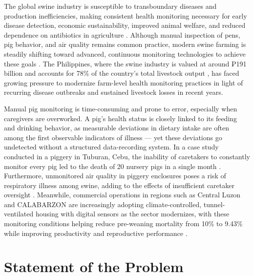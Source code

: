 The global swine industry is susceptible to transboundary diseases and production inefficiencies, making consistent health monitoring necessary for early disease detection, economic sustainability, improved animal welfare, and reduced dependence on antibiotics in agriculture \cite{beyondtech2025smart}. Although manual inspection of pens, pig behavior, and air quality remains common practice, modern swine farming is steadily shifting toward advanced, continuous monitoring technologies to achieve these goals \cite{beyondtech2025smart}. The Philippines, where the swine industry is valued at around ₱191 billion and accounts for 78\% of the country's total livestock output \cite{lo2025rebooting}\cite{livestockproduction2026}, has faced growing pressure to modernize farm-level health monitoring practices in light of recurring disease outbreaks and sustained livestock losses in recent years.

Manual pig monitoring is time-consuming and prone to error, especially when caregivers are overworked. A pig's health status is closely linked to its feeding and drinking behavior, as measurable deviations in dietary intake are often among the first observable indicators of illness --- yet these deviations go undetected without a structured data-recording system. In a case study conducted in a piggery in Tuburan, Cebu, the inability of caretakers to constantly monitor every pig led to the death of 20 nursery pigs in a single month \cite{dingcong2017monitoring}. Furthermore, unmonitored air quality in piggery enclosures poses a risk of respiratory illness among swine, adding to the effects of insufficient caretaker oversight \cite{lo2025rebooting}\cite{livestockproduction2026}. Meanwhile, commercial operations in regions such as Central Luzon and CALABARZON are increasingly adopting climate-controlled, tunnel-ventilated housing with digital sensors as the sector modernizes, with these monitoring conditions helping reduce pre-weaning mortality from 10\% to 9.43\% while improving productivity and reproductive performance \cite{lo2025rebooting}\cite{livestockproduction2026}.


\section{Statement of the Problem}

